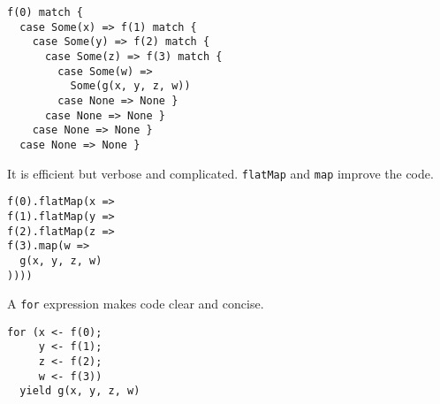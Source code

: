 \begin{verbatim}
f(0) match {
  case Some(x) => f(1) match {
    case Some(y) => f(2) match {
      case Some(z) => f(3) match {
        case Some(w) =>
          Some(g(x, y, z, w))
        case None => None }
      case None => None }
    case None => None }
  case None => None }
\end{verbatim}

It is efficient but verbose and complicated. \verb!flatMap! and \verb!map!
improve the code.

\begin{verbatim}
f(0).flatMap(x =>
f(1).flatMap(y =>
f(2).flatMap(z =>
f(3).map(w =>
  g(x, y, z, w)
))))
\end{verbatim}

A \verb!for! expression makes code clear and concise.

\begin{verbatim}
for (x <- f(0);
     y <- f(1);
     z <- f(2);
     w <- f(3))
  yield g(x, y, z, w)
\end{verbatim}
